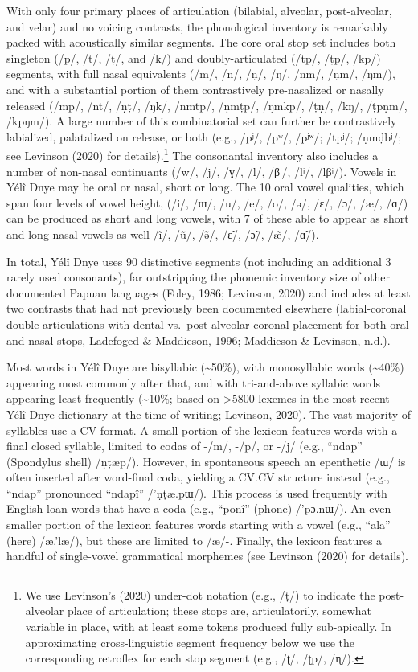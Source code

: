 \documentclass[english,,man,floatsintext]{apa6}
\begin{document}
With only four primary places of articulation (bilabial, alveolar, post-alveolar, and velar) and no voicing contrasts, the phonological inventory is remarkably packed with acoustically similar segments. The core oral stop set includes both singleton (/p/, /t/, /ṭ/, and /k/) and doubly-articulated (/tp/, /ṭp/, /kp/) segments, with full nasal equivalents (/m/, /n/, /ṇ/, /ŋ/, /nm/, /ṇm/, /ŋm/), and with a substantial portion of them contrastively pre-nasalized or nasally released (/mp/, /nt/, /ṇṭ/, /ŋk/, /nmtp/, /ṇmṭp/, /ŋmkp/, /ṭṇ/, /kŋ/, /ṭpṇm/, /kpŋm/). A large number of this combinatorial set can further be contrastively labialized, palatalized on release, or both (e.g., /pʲ/, /pʷ/, /pʲʷ/; /tpʲ/; /ṇmḍbʲ/; see Levinson (2020) for details).\footnote{We use Levinson's (2020) under-dot notation (e.g., /ṭ/) to indicate the post-alveolar place of articulation; these stops are, articulatorily, somewhat variable in place, with at least some tokens produced fully sub-apically. In approximating cross-linguistic segment frequency below we use the corresponding retroflex for each stop segment (e.g., /ʈ/, /ʈp/, /ɳ/).} The consonantal inventory also includes a number of non-nasal continuants (/w/, /j/, /ɣ/, /l/, /βʲ/, /lʲ/, /lβʲ/). Vowels in Yélî Dnye may be oral or nasal, short or long. The 10 oral vowel qualities, which span four levels of vowel height, (/i/, /ɯ/, /u/, /e/, /o/, /ə/, /ɛ/, /ɔ/, /æ/, /ɑ/) can be produced as short and long vowels, with 7 of these able to appear as short and long nasal vowels as well /ĩ/, /ũ/, /ə̃/, /ɛ̃/, /ɔ̃/, /æ̃/, /ɑ̃/).

In total, Yélî Dnye uses 90 distinctive segments (not including an additional 3 rarely used consonants), far outstripping the phonemic inventory size of other documented Papuan languages (Foley, 1986; Levinson, 2020) and includes at least two contrasts that had not previously been documented elsewhere (labial-coronal double-articulations with dental vs.~post-alveolar coronal placement for both oral and nasal stops, Ladefoged \& Maddieson, 1996; Maddieson \& Levinson, n.d.).

Most words in Yélî Dnye are bisyllabic (\textasciitilde{}50\%), with monosyllabic words (\textasciitilde{}40\%) appearing most commonly after that, and with tri-and-above syllabic words appearing least frequently (\textasciitilde{}10\%; based on \textgreater{}5800 lexemes in the most recent Yélî Dnye dictionary at the time of writing; Levinson, 2020). The vast majority of syllables use a CV format. A small portion of the lexicon features words with a final closed syllable, limited to codas of -/m/, -/p/, or -/j/ (e.g., \enquote{ndap} (Spondylus shell) /ṇṭæp/). However, in spontaneous speech an epenthetic /ɯ/ is often inserted after word-final coda, yielding a CV.CV structure instead (e.g., \enquote{ndap} pronounced \enquote{ndapî} /'ṇṭæ.pɯ/). This process is used frequently with English loan words that have a coda (e.g., \enquote{ponî} (phone) /'pɔ.nɯ/). An even smaller portion of the lexicon features words starting with a vowel (e.g., \enquote{ala} (here) /æ.'læ/), but these are limited to /æ/-. Finally, the lexicon features a handful of single-vowel grammatical morphemes (see Levinson (2020) for details).
\end{document}
